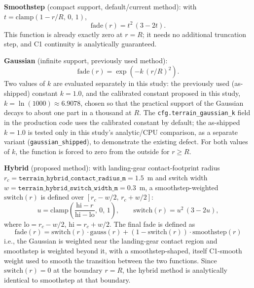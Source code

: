 \textbf{Smoothstep} (compact support, default/current method): with
$t = \mathrm{clamp}(1-r/R,\,0,\,1)$,
\begin{equation}
\mathrm{fade}(r) = t^2\,(3-2t).
\label{eq:smoothstep}
\end{equation}
This function is already exactly zero at $r=R$; it needs no additional
truncation step, and C1 continuity is analytically guaranteed.

\textbf{Gaussian} (infinite support, previously used method):
\begin{equation}
\mathrm{fade}(r) = \exp\!\left(-k\,(r/R)^2\right).
\label{eq:gauss}
\end{equation}
Two values of $k$ are evaluated separately in this study: the previously
used (as-shipped) constant $k=1.0$, and the calibrated constant proposed
in this study, $k=\ln(1000)\approx 6.9078$, chosen so that the practical
support of the Gaussian decays to about one part in a thousand at $R$.
The \texttt{cfg.terrain\_gaussian\_k} field in the production code uses
the calibrated constant by default; the as-shipped $k=1.0$ is tested only
in this study's analytic/CPU comparison, as a separate variant
(\texttt{gaussian\_shipped}), to demonstrate the existing defect. For both
values of $k$, the function is forced to zero from the outside for
$r\ge R$.

\textbf{Hybrid} (proposed method): with landing-gear contact-footprint
radius $r_c = \texttt{terrain\_hybrid\_contact\_radius\_m}=1.5$~m and
switch width $w=\texttt{terrain\_hybrid\_switch\_width\_m}=0.3$~m, a
smoothstep-weighted $\mathrm{switch}(r)$ is defined over
$[r_c-w/2,\,r_c+w/2]$:
\begin{equation}
u = \mathrm{clamp}\!\left(\frac{\mathrm{hi}-r}{\mathrm{hi}-\mathrm{lo}},\,0,\,1\right),
\qquad
\mathrm{switch}(r) = u^2\,(3-2u),
\label{eq:switch}
\end{equation}
where $\mathrm{lo}=r_c-w/2$, $\mathrm{hi}=r_c+w/2$. The final fade is
defined as
\begin{equation}
\mathrm{fade}(r) = \mathrm{switch}(r)\cdot\mathrm{gauss}(r) +
\left(1-\mathrm{switch}(r)\right)\cdot\mathrm{smoothstep}(r)
\label{eq:hybrid}
\end{equation}
i.e., the Gaussian is weighted near the landing-gear contact region and
smoothstep is weighted beyond it, with a smoothstep-shaped, itself
C1-smooth weight used to smooth the transition between the two
functions. Since $\mathrm{switch}(r)=0$ at the boundary $r=R$, the hybrid
method is analytically identical to smoothstep at that boundary.

